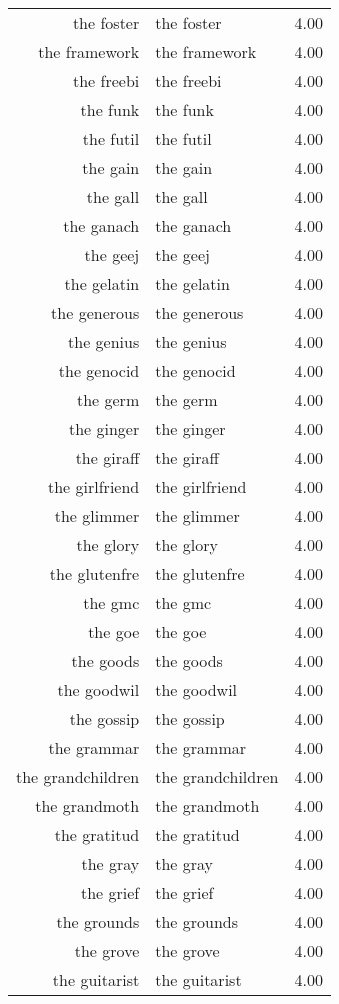 \begin{table}[ht]
\begin{tabular}{rlr}
  the foster & the foster & 4.00 \\ 
  the framework & the framework & 4.00 \\ 
  the freebi & the freebi & 4.00 \\ 
  the funk & the funk & 4.00 \\ 
  the futil & the futil & 4.00 \\ 
  the gain & the gain & 4.00 \\ 
  the gall & the gall & 4.00 \\ 
  the ganach & the ganach & 4.00 \\ 
  the geej & the geej & 4.00 \\ 
  the gelatin & the gelatin & 4.00 \\ 
  the generous & the generous & 4.00 \\ 
  the genius & the genius & 4.00 \\ 
  the genocid & the genocid & 4.00 \\ 
  the germ & the germ & 4.00 \\ 
  the ginger & the ginger & 4.00 \\ 
  the giraff & the giraff & 4.00 \\ 
  the girlfriend & the girlfriend & 4.00 \\ 
  the glimmer & the glimmer & 4.00 \\ 
  the glory & the glory & 4.00 \\ 
  the glutenfre & the glutenfre & 4.00 \\ 
  the gmc & the gmc & 4.00 \\ 
  the goe & the goe & 4.00 \\ 
  the goods & the goods & 4.00 \\ 
  the goodwil & the goodwil & 4.00 \\ 
  the gossip & the gossip & 4.00 \\ 
  the grammar & the grammar & 4.00 \\ 
  the grandchildren & the grandchildren & 4.00 \\ 
  the grandmoth & the grandmoth & 4.00 \\ 
  the gratitud & the gratitud & 4.00 \\ 
  the gray & the gray & 4.00 \\ 
  the grief & the grief & 4.00 \\ 
  the grounds & the grounds & 4.00 \\ 
  the grove & the grove & 4.00 \\ 
  the guitarist & the guitarist & 4.00 \\ 

\end{tabular}
\end{table}
